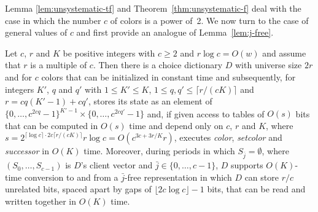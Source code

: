 \documentclass[envcountsame,envcountsect,undated,nolinenumbers]{lnthi}
\def\Tvn#1{\hbox{\textit{#1\/}}}
\def\Tfloor#1{\lfloor #1\rfloor}
\def\Tceil#1{\lceil #1\rceil}
\def\jj{{\bar j}}
\begin{document}
Lemma \ref{lem:unsystematic-tf}
and Theorem~\ref{thm:unsystematic-f}
deal with the case in which the number $c$ of colors
is a power of~2.
We now turn to the case of general values of $c$
and first provide an analogue of
Lemma~\ref{lem:j-free}.

\begin{lemma}
\label{lem:j-free-c}Let $c$, $r$ and $K$ be positive integers
with $c\ge 2$ and $r\log c=O(w)$
and assume that $r$ is a multiple of $c$.
Then there is a choice dictionary $D$ with universe size
$2 r$ and for $c$ colors that can be initialized
in constant time and subsequently,
for integers $K'$, $q$ and $q'$ with $1\le K'\le K$,
$1\le q,q'\le\Tceil{{r/{(c K)}}}$
and $r=c q(K'-1)+c q'$, stores its
state as an element of
$\{0,\ldots,c^{2 c q}-1\}^{K'-1}\times\{0,\ldots,c^{2 c q'}-1\}$
and, if given access to tables of
$O(s)$ bits that can be computed in
$O(s)$ time and depend only on $c$, $r$ and $K$,
where $s=2^{\Tceil{\log c}\cdot 2 c\Tceil{{r/{(c K)}}}} r\log c
=O(c^{3 c+{{3 r}/K}} r)$,
executes
\Tvn{color}, \Tvn{setcolor} and
\Tvn{successor} in $O(K)$ time.
Moreover, during periods in which
$S_{\jj}=\emptyset$, where $(S_0,\ldots,S_{c-1})$
is $D$'s client vector and $\jj\in\{0,\ldots,c-1\}$,
$D$ supports $O(K)$-time conversion to and from
a $\jj$-free representation in which $D$ can
store ${r/c}$ unrelated bits, spaced apart by
gaps of $\Tfloor{2 c\log c}-1$ bits, that can be
read and written together in $O(K)$ time.
\end{lemma}
\end{document}

